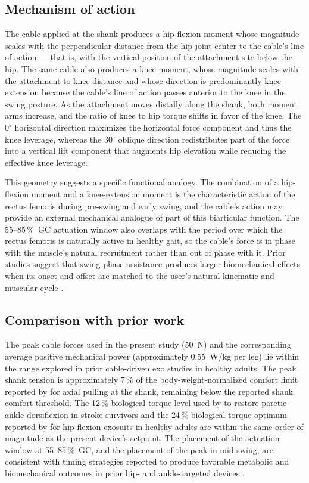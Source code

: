 \documentclass[11pt,a4paper]{article}
\begin{document}
\subsection*{Mechanism of action}
The cable applied at the shank produces a hip-flexion moment whose magnitude scales with the perpendicular distance from the hip joint center to the cable's line of action — that is, with the vertical position of the attachment site below the hip. The same cable also produces a knee moment, whose magnitude scales with the attachment-to-knee distance and whose direction is predominantly knee-extension because the cable's line of action passes anterior to the knee in the swing posture. As the attachment moves distally along the shank, both moment arms increase, and the ratio of knee to hip torque shifts in favor of the knee. The 0$^\circ$ horizontal direction maximizes the horizontal force component and thus the knee leverage, whereas the 30$^\circ$ oblique direction redistributes part of the force into a vertical lift component that augments hip elevation while reducing the effective knee leverage.

This geometry suggests a specific functional analogy. The combination of a hip-flexion moment and a knee-extension moment is the characteristic action of the rectus femoris during pre-swing and early swing, and the cable's action may provide an external mechanical analogue of part of this biarticular function. The 55--85\,\%~GC actuation window also overlaps with the period over which the rectus femoris is naturally active in healthy gait, so the cable's force is in phase with the muscle's natural recruitment rather than out of phase with it. Prior studies suggest that swing-phase assistance produces larger biomechanical effects when its onset and offset are matched to the user's natural kinematic and muscular cycle \citep{ding2016,galle2017}.

\subsection*{Comparison with prior work}
The peak cable forces used in the present study (50~N) and the corresponding average positive mechanical power (approximately 0.55~W/kg per leg) lie within the range explored in prior cable-driven exo studies in healthy adults. The peak shank tension is approximately 7\,\% of the body-weight-normalized comfort limit reported by \citet{yandell2020} for axial pulling at the shank, remaining below the reported shank comfort threshold. The 12\,\% biological-torque level used by \citet{awad2017} to restore paretic-ankle dorsiflexion in stroke survivors and the 24\,\% biological-torque optimum reported by \citet{kim2022} for hip-flexion exosuits in healthy adults are within the same order of magnitude as the present device's setpoint. The placement of the actuation window at 55--85\,\%~GC, and the placement of the peak in mid-swing, are consistent with timing strategies reported to produce favorable metabolic and biomechanical outcomes in prior hip- and ankle-targeted devices \citep{ding2016,galle2017}.
\end{document}
